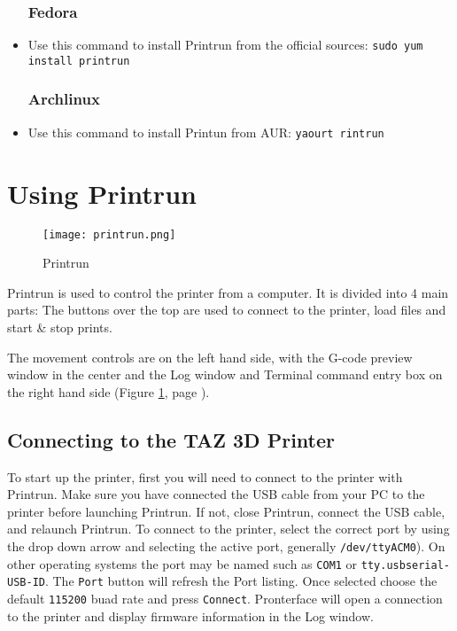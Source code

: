 \begin{itemize}
\subsubsection{Fedora}
\item Use this command to install Printrun from the official sources: \texttt{sudo yum install printrun}

\subsubsection{Archlinux}
\item Use this command to install Printun from AUR: \texttt{yaourt rintrun}

\end{itemize}

\section{Using Printrun}

\begin{figure}[H]
\centering
\texttt{[image: printrun.png]}
\caption{Printrun}
\label{fig:Printrun}
\end{figure}

Printrun is used to control the printer from a computer. It is divided into 4 main parts: The buttons over the top are used to connect to the printer, load files and start \& stop prints.

The movement controls are on the left hand side, with the G-code preview window in the center and the Log window and Terminal command entry box on the right hand side (Figure \ref{fig:Printrun}, page \pageref{fig:Printrun}).

\subsection{Connecting to the TAZ 3D Printer}
To start up the printer, first you will need to connect to the printer with Printrun. Make sure you have connected the USB cable from your PC to the printer before launching Printrun. If not, close Printrun, connect the USB cable, and relaunch Printrun. To connect to the printer, select the correct port by using the drop down arrow and selecting the active port, generally \texttt{/dev/ttyACM0}). On other operating systems the port may be named such as \texttt{COM1} or \texttt{tty.usbserial-USB-ID}. The \texttt{Port} button will refresh the Port listing. Once selected choose the default \texttt{115200} buad rate and press \texttt{Connect}. Pronterface will open a connection to the printer and display firmware information in the Log window. 

